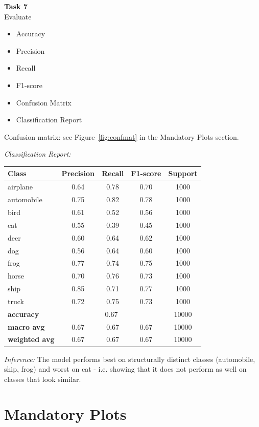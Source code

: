 \documentclass[11pt]{article}
\begin{document}
\textbf{Task 7} \\
Evaluate
\begin{itemize}
    \item Accuracy
    \item Precision
    \item Recall
    \item F1-score
    \item Confusion Matrix
    \item Classification Report
\end{itemize}

Confusion matrix: see Figure~\ref{fig:confmat} in the Mandatory Plots section.

\textit{Classification Report:}
\begin{center}
\begin{tabular}{lcccc}
\toprule
\textbf{Class} & \textbf{Precision} & \textbf{Recall} & \textbf{F1-score} & \textbf{Support} \\
\midrule
airplane   & 0.64 & 0.78 & 0.70 & 1000 \\
automobile & 0.75 & 0.82 & 0.78 & 1000 \\
bird       & 0.61 & 0.52 & 0.56 & 1000 \\
cat        & 0.55 & 0.39 & 0.45 & 1000 \\
deer       & 0.60 & 0.64 & 0.62 & 1000 \\
dog        & 0.56 & 0.64 & 0.60 & 1000 \\
frog       & 0.77 & 0.74 & 0.75 & 1000 \\
horse      & 0.70 & 0.76 & 0.73 & 1000 \\
ship       & 0.85 & 0.71 & 0.77 & 1000 \\
truck      & 0.72 & 0.75 & 0.73 & 1000 \\
\midrule
\textbf{accuracy}    & \multicolumn{3}{c}{0.67} & 10000 \\
\textbf{macro avg}   & 0.67 & 0.67 & 0.67 & 10000 \\
\textbf{weighted avg}& 0.67 & 0.67 & 0.67 & 10000 \\
\bottomrule
\end{tabular}
\end{center}
\textit{Inference:} The model performs best on structurally distinct classes (automobile, ship, frog) and worst on cat - i.e. showing that it does not perform as well on classes that look similar.

\section{Mandatory Plots}
\end{document}
